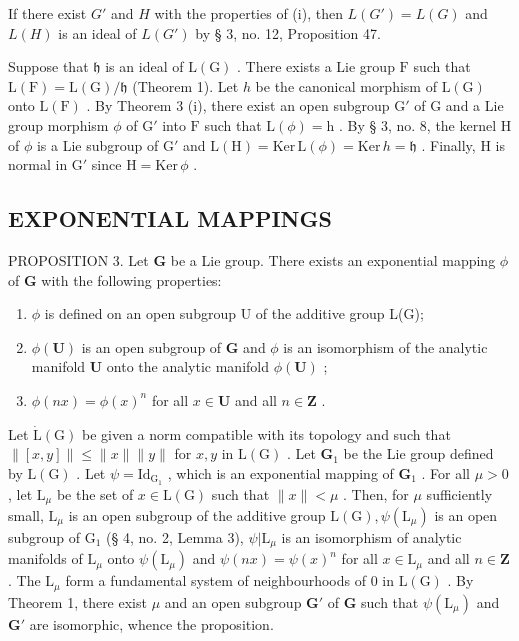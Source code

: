 If there exist \(G'\) and \(H\) with the properties of (i), then \(L(G') = L(G)\) and \(L(H)\) is an ideal of \(L(G')\) by § 3, no. 12, Proposition 47.

Suppose that \(\mathfrak{h}\) is an ideal of \(\mathrm{L}(\mathrm{G})\) . There exists a Lie group \(\mathrm{F}\) such that \(\mathrm{L}(\mathrm{F}) = \mathrm{L}(\mathrm{G}) / \mathfrak{h}\) (Theorem 1). Let \(h\) be the canonical morphism of \(\mathrm{L}(\mathrm{G})\) onto \(\mathrm{L}(\mathrm{F})\) . By Theorem 3 (i), there exist an open subgroup \(\mathrm{G}'\) of \(\mathrm{G}\) and a Lie group morphism \(\phi\) of \(\mathrm{G}'\) into \(\mathrm{F}\) such that \(\mathrm{L}(\phi) = \mathrm{h}\) . By § 3, no. 8, the kernel \(\mathrm{H}\) of \(\phi\) is a Lie subgroup of \(\mathrm{G}'\) and \(\mathrm{L}(\mathrm{H}) = \mathrm{Ker} \, \mathrm{L}(\phi) = \mathrm{Ker} \, h = \mathfrak{h}\) . Finally, \(\mathrm{H}\) is normal in \(\mathrm{G}'\) since \(\mathrm{H} = \mathrm{Ker} \, \phi\) .

\subsection{EXPONENTIAL MAPPINGS}

PROPOSITION 3. Let \(\mathbf{G}\) be a Lie group. There exists an exponential mapping \(\phi\) of \(\mathbf{G}\) with the following properties:

\begin{enumerate}
\def\labelenumi{(\roman{enumi})}
\item
  \(\phi\) is defined on an open subgroup U of the additive group L(G);
\item
  \(\phi (\mathbf{U})\) is an open subgroup of \(\mathbf{G}\) and \(\phi\) is an isomorphism of the analytic manifold \(\mathbf{U}\) onto the analytic manifold \(\phi (\mathbf{U})\) ;
\item
  \(\phi(nx) = \phi(x)^n\) for all \(x \in \mathbf{U}\) and all \(n \in \mathbf{Z}\) .
\end{enumerate}

Let \(\dot{\mathrm{L}}(\mathrm{G})\) be given a norm compatible with its topology and such that \(\| [x,y]\| \leqslant \| x\| \| y\|\) for \(x,y\) in \(\mathrm{L}(\mathrm{G})\) . Let \(\mathbf{G}_1\) be the Lie group defined by \(\mathrm{L}(\mathrm{G})\) . Let \(\psi = \mathrm{Id}_{\mathrm{G}_1}\) , which is an exponential mapping of \(\mathbf{G}_1\) . For all \(\mu >0\) , let \(\mathrm{L}_{\mu}\) be the set of \(x\in \mathrm{L}(\mathrm{G})\) such that \(\| x\| < \mu\) . Then, for \(\mu\) sufficiently small, \(\mathrm{L}_{\mu}\) is an open subgroup of the additive group \(\mathrm{L}(\mathrm{G}),\psi (\mathrm{L}_{\mu})\) is an open subgroup of \(\mathrm{G}_1\) (§ 4, no. 2, Lemma 3), \(\psi |\mathrm{L}_{\mu}\) is an isomorphism of analytic manifolds of \(\mathrm{L}_{\mu}\) onto \(\psi (\mathrm{L}_{\mu})\) and \(\psi (nx) = \psi (x)^n\) for all \(x\in \mathrm{L}_{\mu}\) and all \(n\in \mathbf{Z}\) . The \(\mathrm{L}_{\mu}\) form a fundamental system of neighbourhoods of 0 in \(\mathrm{L}(\mathrm{G})\) . By Theorem 1, there exist \(\mu\) and an open subgroup \(\mathbf{G}'\) of \(\mathbf{G}\) such that \(\psi (\mathrm{L}_{\mu})\) and \(\mathbf{G}'\) are isomorphic, whence the proposition.

